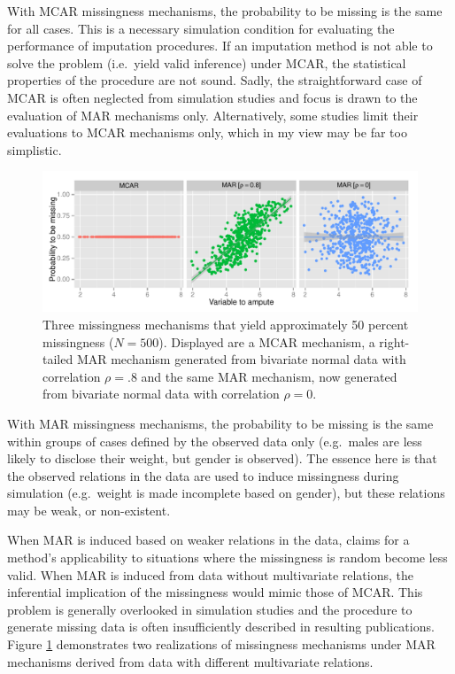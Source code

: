 \documentclass[
]{article}
\begin{document}
With MCAR missingness mechanisms, the probability to be missing is the
same for all cases. This is a necessary simulation condition for
evaluating the performance of imputation procedures. If an imputation
method is not able to solve the problem (i.e.~yield valid inference)
under MCAR, the statistical properties of the procedure are not sound.
Sadly, the straightforward case of MCAR is often neglected from
simulation studies and focus is drawn to the evaluation of MAR
mechanisms only. Alternatively, some studies limit their evaluations to
MCAR mechanisms only, which in my view may be far too simplistic.

\begin{figure}
\centering
\includegraphics{img/plot_mmech.pdf}
\caption{\label{fig:mis_mech}Three missingness mechanisms that yield
approximately 50 percent missingness (\(N=500\)). Displayed are a MCAR
mechanism, a right-tailed MAR mechanism generated from bivariate normal
data with correlation \(\rho=.8\) and the same MAR mechanism, now
generated from bivariate normal data with correlation \(\rho= 0\).}
\end{figure}

With MAR missingness mechanisms, the probability to be missing is the
same within groups of cases defined by the observed data only
(e.g.~males are less likely to disclose their weight, but gender is
observed). The essence here is that the observed relations in the data
are used to induce missingness during simulation (e.g.~weight is made
incomplete based on gender), but these relations may be weak, or
non-existent.

When MAR is induced based on weaker relations in the data, claims for a
method's applicability to situations where the missingness is random
become less valid. When MAR is induced from data without multivariate
relations, the inferential implication of the missingness would mimic
those of MCAR. This problem is generally overlooked in simulation
studies and the procedure to generate missing data is often
insufficiently described in resulting publications. Figure
\ref{fig:mis_mech} demonstrates two realizations of missingness
mechanisms under MAR mechanisms derived from data with different
multivariate relations.
\end{document}
